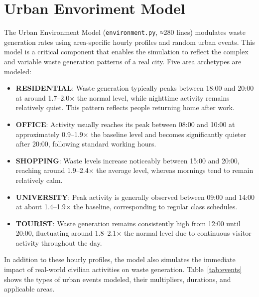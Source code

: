 \documentclass[12pt,a4paper]{report}
\begin{document}
\section{Urban Envoriment Model}

\indent The Urban Environment Model (\texttt{environment.py}, ≈280 lines) modulates waste generation rates using area-specific hourly profiles and random urban events. This model is a critical component that enables the simulation to reflect the complex and variable waste generation patterns of a real city. Five area archetypes are modeled:

\begin{itemize}[leftmargin=1.5cm]
  \item \textbf{RESIDENTIAL}: Waste generation typically peaks between 18:00 and 20:00 at around 1.7--2.0$\times$ the normal level, while nighttime activity remains relatively quiet. This pattern reflects people returning home after work.

  \item \textbf{OFFICE}: Activity usually reaches its peak between 08:00 and 10:00 at approximately 0.9--1.9$\times$ the baseline level and becomes significantly quieter after 20:00, following standard working hours.

  \item \textbf{SHOPPING}: Waste levels increase noticeably between 15:00 and 20:00, reaching around 1.9--2.4$\times$ the average level, whereas mornings tend to remain relatively calm.

  \item \textbf{UNIVERSITY}: Peak activity is generally observed between 09:00 and 14:00 at about 1.4--1.9$\times$ the baseline, corresponding to regular class schedules.

  \item \textbf{TOURIST}: Waste generation remains consistently high from 12:00 until 20:00, fluctuating around 1.8--2.1$\times$ the normal level due to continuous visitor activity throughout the day.
\end{itemize}

\indent In addition to these hourly profiles, the model also simulates the immediate impact of real-world civilian activities on waste generation. Table~\ref{tab:events} shows the types of urban events modeled, their multipliers, durations, and applicable areas.
\end{document}
